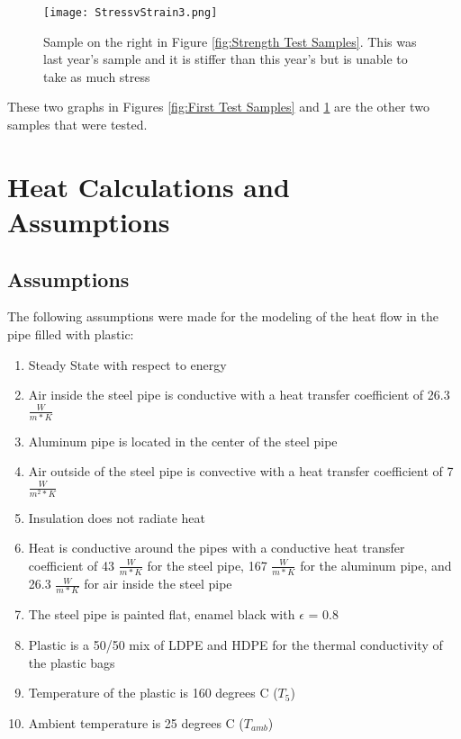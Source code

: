 \documentclass[11pt,english]{article}
\begin{document}
\begin{figure}[h!]
\centering
\texttt{[image: StressvStrain3.png]}
\caption{ Sample on the right in Figure \ref{fig:Strength Test Samples}.  This was last year’s sample and it is stiffer than this year’s but is unable to take as much stress}
\label{fig:Second Test Samples}
\end{figure}
\newpage

These two graphs in Figures \ref{fig:First Test Samples} and \ref{fig:Second Test Samples} are the other two samples that were tested. 
\section{Heat Calculations and Assumptions}
\subsection{Assumptions}
\label{App:modeling}
The following assumptions were made for the modeling of the heat flow in the pipe filled with plastic: 
\begin{enumerate}
\item Steady State with respect to energy 
\item  Air inside the steel pipe is conductive with a heat transfer coefficient of 26.3 $\frac{W}{m*K}$
\item  Aluminum pipe is located in the center of the steel pipe
\item  Air outside of the steel pipe is convective with a heat transfer coefficient of 7 $\frac{W}{m^2*K}$
\item  Insulation does not radiate heat
\item  Heat is conductive around the pipes with a conductive heat transfer coefficient of 43 $\frac{W}{m*K}$ for the steel pipe, 167 $\frac{W}{m*K}$ for the aluminum pipe, and 26.3 $\frac{W}{m*K}$ for air inside the steel pipe
\item  The steel pipe is painted flat, enamel black with $\epsilon$ = 0.8
\item  Plastic is a 50/50 mix of LDPE and HDPE for the thermal conductivity of the plastic bags
\item  Temperature of the plastic is 160 degrees C ($T_5$)
\item  Ambient temperature is 25 degrees C ($T_{amb}$)
\end{enumerate} 
\end{document}
